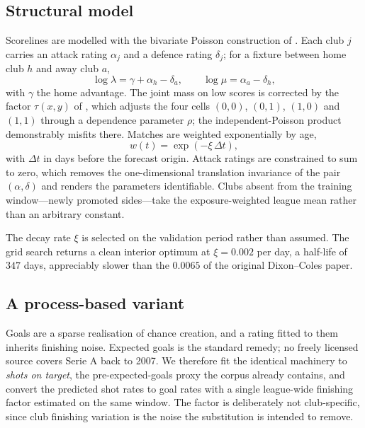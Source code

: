 \documentclass[11pt]{article}
\begin{document}
\subsection{Structural model}

Scorelines are modelled with the bivariate Poisson construction of
\citet{dixoncoles1997}. Each club $j$ carries an attack rating $\alpha_j$ and a
defence rating $\delta_j$; for a fixture between home club $h$ and away club
$a$,
\begin{equation}
\log \lambda = \gamma + \alpha_h - \delta_a, \qquad
\log \mu = \alpha_a - \delta_h ,
\end{equation}
with $\gamma$ the home advantage. The joint mass on low scores is corrected by
the factor $\tau(x,y)$ of \citet{dixoncoles1997}, which adjusts the four cells
$(0,0)$, $(0,1)$, $(1,0)$ and $(1,1)$ through a dependence parameter $\rho$; the
independent-Poisson product demonstrably misfits there. Matches are weighted
exponentially by age,
\begin{equation}
w(t) = \exp\!\left(-\xi \, \Delta t\right),
\end{equation}
with $\Delta t$ in days before the forecast origin. Attack ratings are
constrained to sum to zero, which removes the one-dimensional translation
invariance of the pair $(\alpha, \delta)$ and renders the parameters
identifiable. Clubs absent from the training window---newly promoted
sides---take the exposure-weighted league mean rather than an arbitrary
constant.

The decay rate $\xi$ is selected on the validation period rather than assumed.
The grid search returns a clean interior optimum at $\xi = 0.002$ per day, a
half-life of $347$ days, appreciably slower than the $0.0065$ of the original
Dixon--Coles paper.

\subsection{A process-based variant}

Goals are a sparse realisation of chance creation, and a rating fitted to them
inherits finishing noise. Expected goals is the standard remedy; no freely
licensed source covers Serie A back to 2007. We therefore fit the identical
machinery to \emph{shots on target}, the pre-expected-goals proxy the corpus
already contains, and convert the predicted shot rates to goal rates with a
single league-wide finishing factor estimated on the same window. The factor is
deliberately not club-specific, since club finishing variation is the noise the
substitution is intended to remove.
\end{document}
